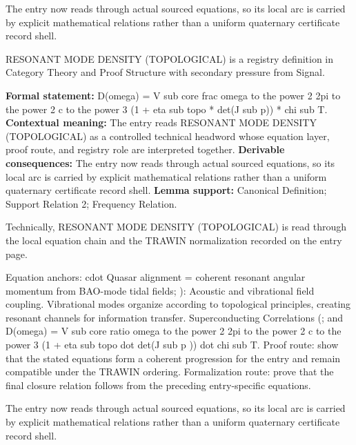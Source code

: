 The entry now reads through actual sourced equations, so its local arc is carried by explicit mathematical relations rather than a uniform quaternary certificate record shell.
\clearpage


\begingroup\small
{}
RESONANT MODE DENSITY (TOPOLOGICAL) is a registry definition in Category Theory and Proof Structure with secondary pressure from Signal.

\begingroup\footnotesize\setlength{\emergencystretch}{3em}\sloppy
\textbf{Formal statement:} D(omega) = V sub core frac omega to the power 2 2pi to the power 2 c to the power 3 (1 + eta sub topo * det(J sub p)) * chi sub T. \textbf{Contextual meaning:} The entry reads RESONANT MODE DENSITY (TOPOLOGICAL) as a controlled technical headword whose equation layer, proof route, and registry role are interpreted together. \textbf{Derivable consequences:} The entry now reads through actual sourced equations, so its local arc is carried by explicit mathematical relations rather than a uniform quaternary certificate record shell. \textbf{Lemma support:} Canonical Definition; Support Relation 2; Frequency Relation.\par
\endgroup

Technically, RESONANT MODE DENSITY (TOPOLOGICAL) is read through the local equation chain and the TRAWIN normalization recorded on the entry page.

Equation anchors: cdot Quasar alignment = coherent resonant angular momentum from BAO-mode tidal fields; ): Acoustic and vibrational field coupling. Vibrational modes organize according to topological principles, creating resonant channels for information transfer. Superconducting Correlations (; and D(omega) = V sub core ratio omega to the power 2 2pi to the power 2 c to the power 3 (1 + eta sub topo dot det(J sub p )) dot chi sub T. Proof route: show that the stated equations form a coherent progression for the entry and remain compatible under the TRAWIN ordering. Formalization route: prove that the final closure relation follows from the preceding entry-specific equations.

The entry now reads through actual sourced equations, so its local arc is carried by explicit mathematical relations rather than a uniform quaternary certificate record shell.
\endgroup

